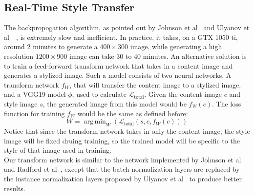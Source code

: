 \documentclass[10pt,twocolumn,letterpaper]{article}
\DeclareMathOperator*{\argmin}{arg\,min}
\begin{document}
\subsection{Real-Time Style Transfer}
The backpropogation algorithm, as pointed out by Johnson et al~\cite{Johnson} and Ulyanov et al~\cite{Ulyanov}~\cite{Ulyanov2}, is extremely slow and inefficient. In practice, it takes, on a GTX 1050 ti, around 2 minutes to generate a $400\times 300$ image, while generating a high resolution $1200\times 900$ image can take 30 to 40 minutes. An alternative solution is to train a feed-forward transform network that takes in a content image and generates a stylized image. 
Such a model consists of two neural networks. A transform network $f_W$, that will transfer the content image to a stylized image, and a VGG19 model $\phi$, used to calculate $\mathcal{L}_{\text{total}}$. Given the content image $c$ and style image $s$, the generated image from this model would be $f_W(c)$. The loss function for training $f_W$ would be the same as defined before:
$$W=\argmin_{W}(\mathcal{L}_{\text{total}}(s, c, f_W(c)))$$
Notice that since the transform network takes in only the content image, the style image will be fixed druing training, so the trained model will be specific to the style of that image used in training. \\
Our transform network is similar to the network implemented by Johnson et al~\cite{Johnson} and Radford et al~\cite{Radford}, except that the batch normalization layers are replaced by the instance normalization layers proposed by Ulyanov et al~\cite{Ulyanov2} to produce better results. 
\end{document}
